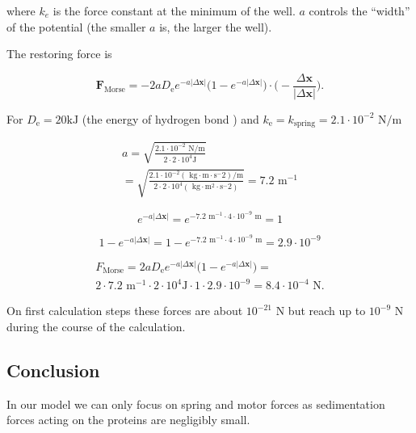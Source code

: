 where $k_e$ is the force constant at the minimum of the well. $a$ controls the ``width'' of the potential (the smaller $a$ is, the larger the well).

The restoring force is

\begin{equation}
\mathbf{F}_\text{Morse} = - 2a D_{\text{e}}e^{- a |\Delta \mathbf{x}|}\big(1 - e^{- a |\Delta \mathbf{x}|}\big) \cdot \big(- \frac{\Delta \mathbf{x}}{|\Delta \mathbf{x}|}\big).
\end{equation}

For $D_{\text{e}} = 20 \text{kJ}$ (the energy of hydrogen bond \cite{mcnaught1997compendium}) and $k_{\text{e}} = k_{\text{spring}} = 2.1 \cdot 10^{-2} \text{ N}/\text{m}$

\begin{equation}
\begin{split}
a = \sqrt {\frac{2.1 \cdot 10^{-2} \text{ N}/\text{m}}{2 \cdot 2 \cdot 10^{4} \text{J}}}\\
= \sqrt {\frac{2.1 \cdot 10^{-2} (\text{ kg} \cdot \text{m} \cdot \text{s}^-2)/\text{m}}{2 \cdot 2 \cdot 10^{4} (\text{ kg} \cdot \text{m}^2 \cdot \text{s}^-2)}} = 7.2 \text{ m}^{-1}
\end{split}
\end{equation}

\begin{equation}
e^{- a |\Delta \mathbf{x}|} = e^{- 7.2 \text{ m}^{-1} \cdot 4 \cdot 10^{-9} \text{ m}} = 1
\end{equation}

\begin{equation}
1 - e^{- a |\Delta \mathbf{x}|} = 1 - e^{- 7.2 \text{ m}^{-1} \cdot 4 \cdot 10^{-9} \text{ m}} = 2.9 \cdot 10^{-9}
\end{equation}

\begin{equation}
\begin{split}
F_\text{Morse} = 2aD_{\text{e}}e^{- a |\Delta \mathbf{x}|}\big(1 - e^{- a |\Delta \mathbf{x}|}\big) =\\
2 \cdot 7.2 \text{ m}^{-1} \cdot 2 \cdot 10^{4} \text{J} \cdot 1 \cdot 2.9 \cdot 10^{-9} = 8.4 \cdot 10^{-4} \text{ N}.
\end{split}
\end{equation}

On first calculation steps these forces are about $10^{-21} \text{ N}$ but reach up to $10^{-9} \text{ N}$ during the course of the calculation.

\subsection{Conclusion}

In our model we can only focus on spring and motor forces as sedimentation forces acting on the proteins are negligibly small.

